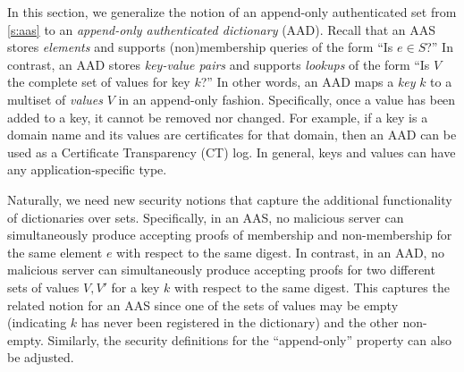 In this section, we generalize the notion of an append-only authenticated set from \cref{s:aas} to an \textit{append-only authenticated dictionary} (AAD).
Recall that an AAS stores \textit{elements} and supports (non)membership queries of the form ``Is $e\in S$?''
In contrast, an AAD stores \textit{key-value pairs} and supports \textit{lookups} of the form ``Is $V$ the complete set of values for key $k$?''
In other words, an AAD maps a \textit{key} $k$ to a multiset of \textit{values} $V$ in an append-only fashion.
Specifically, once a value has been added to a key, it cannot be removed nor changed.
For example, if a key is a domain name and its values are certificates for that domain, then an AAD can be used as a Certificate Transparency (CT) log.
In general, keys and values can have any application-specific type.

Naturally, we need new security notions that capture the additional functionality of dictionaries over sets.
Specifically, in an AAS, no malicious server can simultaneously produce accepting proofs of membership and non-membership for the same element $e$ with respect to the same digest.
In contrast, in an AAD, no malicious server can simultaneously produce accepting proofs for two different sets of values $V,V'$ for a key $k$ with respect to the same digest.
This captures the related notion for an AAS since one of the sets of values may be empty (indicating $k$ has never been registered in the dictionary) and the other non-empty.
Similarly, the security definitions for the ``append-only'' property can also be adjusted.